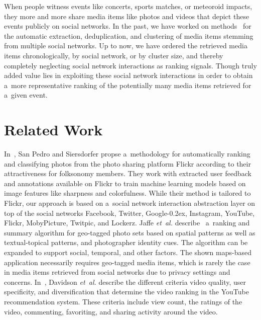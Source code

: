 \documentclass{sig-alternate}
\DeclareRobustCommand{\googleplus}{\mbox{Google\hspace{0em}\raisebox{.28ex}{\tiny\bf +}\kern-0.2ex}\xspace}
\begin{document}
When people witness events like concerts, sports matches, or meteoroid impacts,
they more and more share media items like photos and videos
that depict these events publicly on social networks.
In the past, we have worked on methods~%
\cite{khrouf2012aggregatingsocialmedia,rizzo2012whatfresh}
for the automatic extraction, deduplication, and clustering of media items
stemming from multiple social networks.
Up to now, we have ordered the retrieved media items chronologically,
by social network, or by cluster size, and thereby completely neglecting
social network interactions as ranking signals.
Though truly added value lies in exploiting these social network interactions
in order to obtain a~more representative ranking of the
potentially many media items retrieved for a~given event.

\section{Related Work}

In~\cite{sanpedro2009ranking}, San Pedro and Siersdorfer propse a~methodology
for automatically ranking and classifying photos from the photo sharing platform Flickr
according to their attractiveness for folksonomy members.
They work with extracted user feedback and annotations available on Flickr
to train machine learning models based on
image features like sharpness and colorfulness.
While their method is tailored to Flickr,
our approach is based on a~social network interaction abstraction layer
on top of the social networks Facebook, Twitter, \googleplus, Instagram,
YouTube, Flickr, MobyPicture, Twitpic, and Lockerz.
Jaffe \emph{et~al.} describe~\cite{jaffe2006generatingsummaries} 
a~ranking and summary algorithm for geo-tagged photo sets based on spatial patterns
as well as textual-topical patterns, and photographer identity cues.
The algorithm can be expanded to support social, temporal, and other factors.
The shown maps-based application necessarily requires geo-tagged media items,
which is rarely the case in media items retrieved from social networks
due to privacy settings and concerns. 
In~\cite{davidson2010youtube}, Davidson \emph{et~al.} describe the different criteria
video quality, user specificity, and diversification
that determine the video ranking in the YouTube recommendation system.
These criteria include view count, the ratings of the video, commenting, favoriting,
and sharing activity around the video.
\end{document}
